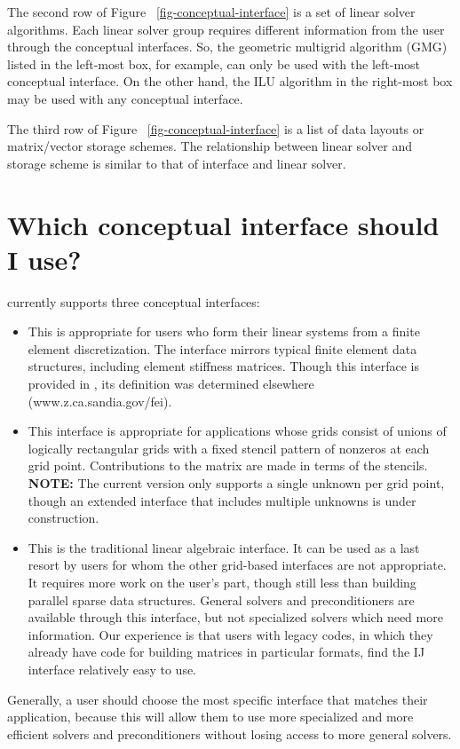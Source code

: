 The second row of Figure ~\ref{fig-conceptual-interface} is a set of linear solver algorithms.
Each linear solver group requires different information from the user through
the conceptual interfaces.  So, the geometric multigrid algorithm (GMG) listed
in the left-most box, for example, can only be used with the left-most conceptual
interface.  On the other hand, the ILU algorithm in the right-most box may be
used with any conceptual interface. 

The third row of Figure ~\ref{fig-conceptual-interface} is a list of data layouts or matrix/vector storage
schemes.  The relationship between linear solver and storage scheme is similar
to that of interface and linear solver.


\section{Which conceptual interface should I use?}

\hypre{} currently supports three conceptual interfaces:

\begin{itemize}

\item
{}
This is appropriate for users who form their linear systems from
a finite element discretization.
The interface mirrors typical finite element data structures,
including element stiffness matrices.
Though this interface is provided in \hypre{}, its definition
was determined elsewhere (www.z.ca.sandia.gov/fei).

\item
{}
This interface is appropriate for applications whose grids
consist of unions of logically rectangular grids with a fixed
stencil pattern of nonzeros at each grid point.
Contributions to the matrix are made in terms of the stencils.
{\bf NOTE:} The current version only supports a single unknown
per grid point, though an extended interface that includes
multiple unknowns is under construction.

\item
{}
This is the traditional linear algebraic interface. 
It can be used as a last resort by users for whom the other
grid-based interfaces are not appropriate.
It requires more work on the user's part, though still less than
building parallel sparse data structures.
General solvers and preconditioners are available through this
interface, but not specialized solvers which need more information.
Our experience is that users with legacy codes, in which they already
have code for building matrices in particular formats, find the
IJ interface relatively easy to use.

\end{itemize}

Generally, a user should choose the most specific interface
that matches their application, because this will allow them
to use more specialized and more efficient solvers and preconditioners
without losing access to more general solvers.